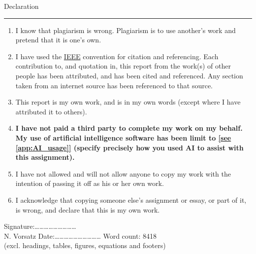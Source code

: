 \newpage
{\Large Declaration}\\
\hrule

\vskip 10mm
\begin{enumerate}
\item I know that plagiarism is wrong. Plagiarism is to use another's work and pretend that it is one's own.
\item I have used the \underline{IEEE} convention for citation and referencing. Each contribution to, and quotation in, this report from the work(s) of other people has been attributed, and has been cited and
referenced. Any section taken from an internet source has been referenced to that source.
\item This report is my own work, and is in my own words (except where I have attributed it to others).
\item \textbf{I have not paid a third party to complete my work on my behalf. My use of artificial intelligence software has been limit to \underline{[see \autoref{app:AI_usage}]} (specify precisely how you used AI to assist with this assignment).}
\item I have not allowed and will not allow anyone to copy my work with the intention of passing it off as his or her own work.
\item I acknowledge that copying someone else's assignment or essay, or part of it, is wrong, and declare that this is my own work.
\end{enumerate}
\vskip 10mm
Signature:\ldots\ldots\ldots\ldots\ldots\ldots\ldots\ldots\ldots 
\\ N. Vorsatz 		%
\vskip10mm
Date:\ldots\ldots\ldots\ldots\ldots\ldots\ldots\ldots\ldots\ldots
\vskip10mm
Word count: 8418\\
(excl. headings, tables, figures, equations and footers)
